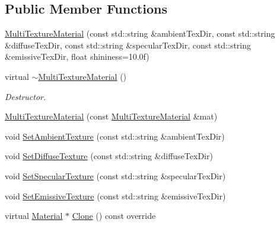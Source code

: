 \subsection*{Public Member Functions}
\begin{DoxyCompactItemize}
\item 
\mbox{\hyperlink{class_geometry_engine_1_1_geometry_material_1_1_multi_texture_material_a2d6f8773c523bc6ddab05b9d76db9020}{Multi\+Texture\+Material}} (const std\+::string \&ambient\+Tex\+Dir, const std\+::string \&diffuse\+Tex\+Dir, const std\+::string \&specular\+Tex\+Dir, const std\+::string \&emissive\+Tex\+Dir, float shininess=10.\+0f)
\item 
\mbox{\label{class_geometry_engine_1_1_geometry_material_1_1_multi_texture_material_a1319543319c75f7a06d037a536f9844a}} 
virtual \mbox{\hyperlink{class_geometry_engine_1_1_geometry_material_1_1_multi_texture_material_a1319543319c75f7a06d037a536f9844a}{$\sim$\+Multi\+Texture\+Material}} ()
\begin{DoxyCompactList}\small\item\em Destructor. \end{DoxyCompactList}\item 
\mbox{\hyperlink{class_geometry_engine_1_1_geometry_material_1_1_multi_texture_material_a78e60d57bd2dcbab07b96fd86426f453}{Multi\+Texture\+Material}} (const \mbox{\hyperlink{class_geometry_engine_1_1_geometry_material_1_1_multi_texture_material}{Multi\+Texture\+Material}} \&mat)
\item 
void \mbox{\hyperlink{class_geometry_engine_1_1_geometry_material_1_1_multi_texture_material_a2679c169c654bb65728ef21db60d5637}{Set\+Ambient\+Texture}} (const std\+::string \&ambient\+Tex\+Dir)
\item 
void \mbox{\hyperlink{class_geometry_engine_1_1_geometry_material_1_1_multi_texture_material_a51249ca0c845bfd39ea3ddc90254092d}{Set\+Diffuse\+Texture}} (const std\+::string \&diffuse\+Tex\+Dir)
\item 
void \mbox{\hyperlink{class_geometry_engine_1_1_geometry_material_1_1_multi_texture_material_a0b4cf7c8265e633210bc39b5e7d31f1d}{Set\+Specular\+Texture}} (const std\+::string \&specular\+Tex\+Dir)
\item 
void \mbox{\hyperlink{class_geometry_engine_1_1_geometry_material_1_1_multi_texture_material_ad0ca544526e65dcd519cd0e82fc4bc7f}{Set\+Emissive\+Texture}} (const std\+::string \&emissive\+Tex\+Dir)
\item 
virtual \mbox{\hyperlink{class_geometry_engine_1_1_geometry_material_1_1_material}{Material}} $\ast$ \mbox{\hyperlink{class_geometry_engine_1_1_geometry_material_1_1_multi_texture_material_a66cef99b68270e1399830bc1b8bc8502}{Clone}} () const override
\end{DoxyCompactItemize}
